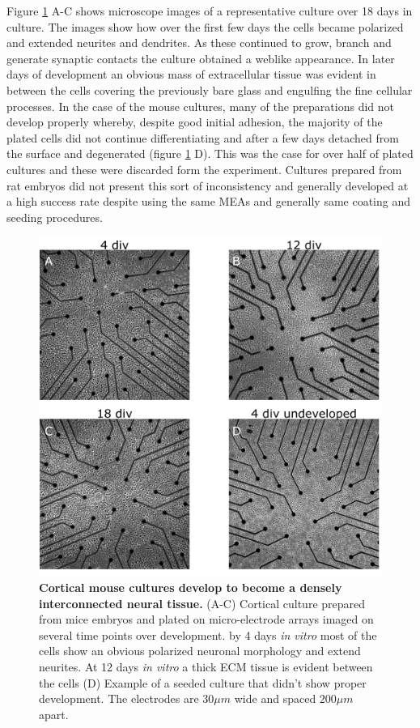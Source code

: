     Figure \ref{fig:activity:mouseImages} A-C shows microscope images of a representative culture over 18 days in culture. The images show how over the first few days the cells became polarized and extended neurites and dendrites. As these continued to grow, branch and generate synaptic contacts the culture obtained a weblike appearance. In later days of development an obvious mass of extracellular tissue was evident in between the cells covering the previously bare glass and engulfing the fine cellular processes. In the case of the mouse cultures, many of the preparations did not develop properly whereby, despite good initial adhesion, the majority of the plated cells did not continue differentiating and after a few days detached from the surface and degenerated (figure \ref{fig:activity:mouseImages} D). This was the case for over half of plated cultures and these were discarded form the experiment. Cultures prepared from rat embryos did not present this sort of inconsistency and generally developed at a high success rate despite using the same MEAs and generally same coating and seeding procedures.
       \begin{figure}[!htb]
            \centering
            \includegraphics[width=15cm]{chapter3/figures/mouseImages/mouseImages.jpg}

            \caption[Representative images of a cortical mouse culture developing on a planar multi electrode array]{\textbf{Cortical mouse cultures develop to become a densely interconnected neural tissue.} (A-C) Cortical culture prepared from mice embryos and plated on micro-electrode arrays imaged on several time points over development. by 4 days \textit{in vitro} most of the cells show an obvious polarized neuronal morphology and extend neurites. At 12 days \textit{in vitro} a thick ECM tissue is evident between the cells (D) Example of a seeded culture that didn't show proper development. The electrodes are \(30 \mu m\) wide and spaced \(200 \mu m\) apart.}
            \label{fig:activity:mouseImages}
        \end{figure}
